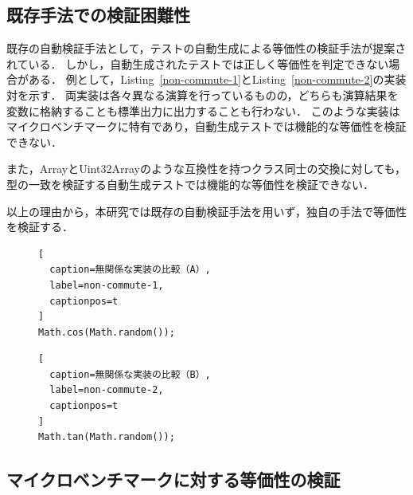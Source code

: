\documentclass[11pt]{jreport}
\newcommand{\fix}[1]{#1}
\begin{document}

\subsection{既存手法での検証困難性}


既存の自動検証手法として，テストの自動生成による等価性の検証手法\fix{\cite{Mirshokraie_2015}}が提案されている．
しかし，自動生成されたテストでは正しく等価性を判定できない場合がある．
例として，Listing~\ref{non-commute-1}とListing~\ref{non-commute-2}の実装対を示す．
両実装は各々異なる演算を行っているものの，どちらも演算結果を変数に格納することも標準出力に出力することも行わない．
このような実装はマイクロベンチマークに特有であり，自動生成テストでは機能的な等価性を検証できない．

また，ArrayとUint32Arrayのような互換性を持つクラス同士の交換に対しても，型の一致を検証する自動生成テストでは機能的な等価性を検証できない．

以上の理由から，本研究では既存の自動検証手法を用いず，独自の手法で等価性を検証する．


\begin{figure}[t]
\captionsetup{name=Listing}
\hspace{0.04\columnwidth}
\begin{minipage}[b]{0.445\linewidth}
\begin{lstlisting}[
  caption=無関係な実装の比較（A）,
  label=non-commute-1,
  captionpos=t
]
Math.cos(Math.random());
\end{lstlisting}
\end{minipage}
\hspace{0.059\columnwidth}
\begin{minipage}[b]{0.445\linewidth}
\begin{lstlisting}[
  caption=無関係な実装の比較（B）,
  label=non-commute-2,
  captionpos=t
]
Math.tan(Math.random());
\end{lstlisting}
\end{minipage}
\end{figure}




\subsection{マイクロベンチマークに対する等価性の検証}
\end{document}
